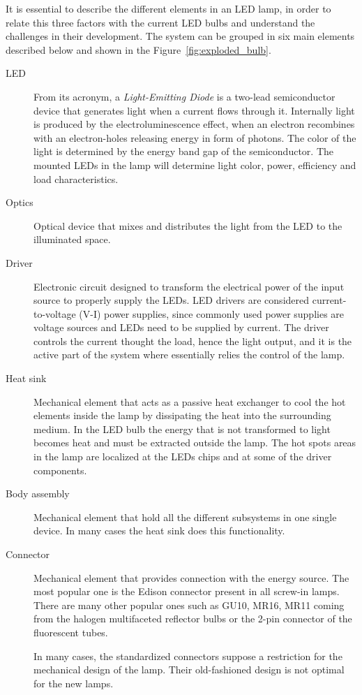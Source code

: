 It is essential to describe the different elements in an LED lamp, in order to relate this three factors with the current LED bulbs and understand the challenges in their development. The system can be grouped in six main elements described below and shown in  the Figure~\ref{fig:exploded_bulb}.

\begin{description}
  \item[LED] From its acronym, a \emph{Light-Emitting Diode}  is a two-lead semiconductor device that generates light when a current flows through it. Internally light is produced by the electroluminescence effect, when an electron recombines with an electron-holes releasing energy in form of photons. The color of the light is determined by the energy band gap of the semiconductor. The mounted LEDs in the lamp will determine light color, power, efficiency and load characteristics.

  \item[Optics] Optical device that mixes and distributes the light from the LED to the illuminated space.

  \item[Driver] Electronic circuit designed to transform the electrical power of the input source to properly supply the LEDs. LED drivers are considered current-to-voltage (V-I) power supplies, since commonly used power supplies are voltage sources and LEDs need to be supplied by current. The driver controls the current thought the load, hence the light output, and it is the active part of the system where essentially relies the control of the lamp.

  \item[Heat sink] Mechanical element that acts as a passive heat exchanger to cool the hot elements inside the lamp by dissipating the heat into the surrounding medium. In the LED bulb the energy that is not transformed to light becomes heat and must be extracted outside the lamp. The hot spots areas in the lamp are localized at the LEDs chips and at some of the driver components.

  \item[Body assembly] Mechanical element that hold all the different subsystems in one single device. In many cases the heat sink does this functionality.

  \item[Connector] Mechanical element that provides connection with the energy source. The most popular one is the Edison connector present in all screw-in lamps. There are many other popular ones such as GU10, MR16, MR11 coming from the halogen multifaceted reflector bulbs or the 2-pin connector of the fluorescent tubes.

      In many cases, the standardized connectors suppose a restriction for the mechanical design of the lamp. Their old-fashioned design is not optimal for the new lamps.
\end{description}

